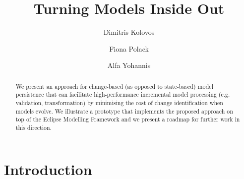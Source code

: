 \documentclass{llncs}
\begin{document}
\renewcommand{\thelstlisting}{\arabic{lstlisting}}
\renewcommand{\labelitemi}{$\bullet$}
\newcommand{\dk}[1]{\textbf{[DK: #1]}}

\title{Turning Models Inside Out}
%
%
\author{Dimitris Kolovos \and Fiona Polack \and Alfa Yohannis}
%
%
%

\maketitle              %

\begin{abstract}
We present an approach for change-based (as opposed to state-based) model persistence that can facilitate high-performance incremental model processing (e.g. validation, transformation) by minimising the cost of change identification when models evolve. We illustrate a prototype that implements the proposed approach on top of the Eclipse Modelling Framework and we present a roadmap for further work in this direction.
\end{abstract}

\section{Introduction}
\label{Introduction}
\end{document}
